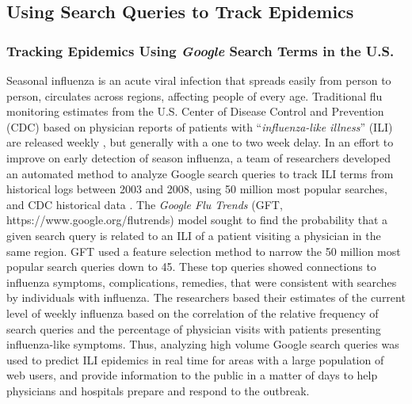\documentclass[sigconf]{acmart}
\begin{document}
\subsection{Using Search Queries to Track Epidemics}

\subsubsection{Tracking Epidemics Using {\itshape Google} Search Terms in the U.S.}

Seasonal influenza is an acute viral infection that spreads easily from person to 
person, circulates across regions, affecting people of every age. Traditional flu 
monitoring estimates from the U.S. Center of Disease Control and Prevention (CDC) 
based on physician reports of patients with ``{\it influenza-like illness}'' (ILI) are 
released weekly \cite{cdc17}, but generally with a one to two week delay. In an effort 
to improve on early detection of season influenza, a team of researchers developed an 
automated method to analyze Google search queries to track ILI terms from historical 
logs between 2003 and 2008, using 50 million most popular searches, and CDC historical 
data \cite{ginsburg09}. The {\it Google Flu Trends} (GFT, https://www.google.org/flutrends)
model sought to find the probability that a given search query is related to an ILI of a 
patient visiting a physician in the same region. GFT used a feature selection method to 
narrow  the 50 million most popular search queries down to 45. These top queries showed 
connections to influenza symptoms, complications, remedies, that were consistent with 
searches by individuals with influenza. The researchers based their estimates of the 
current level of weekly influenza based on the correlation of the relative frequency 
of search queries and the percentage of physician visits with patients presenting 
influenza-like symptoms. Thus, analyzing high volume Google search queries was used 
to predict ILI epidemics in real time for areas with a large population of web users, 
and provide information to the public in a matter of days to help physicians and 
hospitals prepare and respond to the outbreak. 
\end{document}
